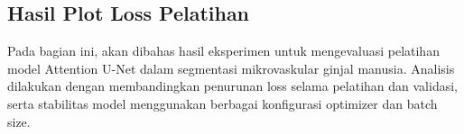 




\subsection{Hasil Plot Loss Pelatihan}

Pada bagian ini, akan dibahas hasil eksperimen untuk mengevaluasi pelatihan model Attention U-Net dalam segmentasi mikrovaskular ginjal manusia. Analisis dilakukan dengan membandingkan penurunan loss selama pelatihan dan validasi, serta stabilitas model menggunakan berbagai konfigurasi optimizer dan batch size.

